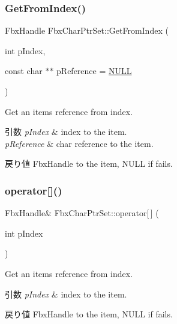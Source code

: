 \mbox{\label{class_fbx_char_ptr_set_ab201112f7e7bbdad802978c451c41680}} 
\subsubsection{\texorpdfstring{Get\+From\+Index()}{GetFromIndex()}}
{\footnotesize\ttfamily Fbx\+Handle Fbx\+Char\+Ptr\+Set\+::\+Get\+From\+Index (\begin{DoxyParamCaption}\item[{int}]{p\+Index,  }\item[{const char $\ast$$\ast$}]{p\+Reference = {\ttfamily \hyperlink{fbxarch_8h_a070d2ce7b6bb7e5c05602aa8c308d0c4}{N\+U\+LL}} }\end{DoxyParamCaption})}

Get an item\textquotesingle{}s reference from index. 
\begin{DoxyParams}{引数}
{\em p\+Index} & index to the item. \\
\hline
{\em p\+Reference} & char reference to the item. \\
\hline
\end{DoxyParams}
\begin{DoxyReturn}{戻り値}
Fbx\+Handle to the item, N\+U\+LL if fails. 
\end{DoxyReturn}
\mbox{\label{class_fbx_char_ptr_set_a925f5012e7dd515e1d3c44584c97101d}} 
\subsubsection{\texorpdfstring{operator[]()}{operator[]()}}
{\footnotesize\ttfamily Fbx\+Handle\& Fbx\+Char\+Ptr\+Set\+::operator\mbox{[}$\,$\mbox{]} (\begin{DoxyParamCaption}\item[{int}]{p\+Index }\end{DoxyParamCaption})}

Get an item\textquotesingle{}s reference from index. 
\begin{DoxyParams}{引数}
{\em p\+Index} & index to the item. \\
\hline
\end{DoxyParams}
\begin{DoxyReturn}{戻り値}
Fbx\+Handle to the item, N\+U\+LL if fails. 
\end{DoxyReturn}
\mbox{\label{class_fbx_char_ptr_set_afb7850c77043dd57c0fae1743ca01d29}} 
